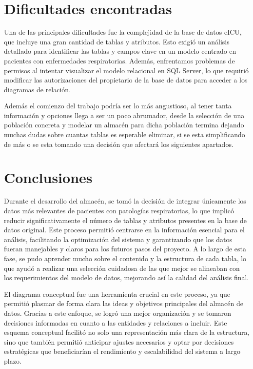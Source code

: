 \documentclass[12pt, a4paper, twoside]{article}
\begin{document}
	

	
	
	
	
	\section{Dificultades encontradas}
	
	
	Una de las principales dificultades fue la complejidad de la base de datos eICU, que incluye una gran cantidad de tablas y atributos. Esto exigió un análisis detallado para identificar las tablas y campos clave en un modelo centrado en pacientes con enfermedades respiratorias. Además, enfrentamos problemas de permisos al intentar visualizar el modelo relacional en SQL Server, lo que requirió modificar las autorizaciones del propietario de la base de datos para acceder a los diagramas de relación.
	
	Además el comienzo del trabajo podría ser lo más angustioso, al tener tanta información y opciones llega a ser un poco abrumador, desde la selección de una población concreta y modelar un almacén para dicha población termina dejando muchas dudas sobre cuantas tablas es esperable eliminar, si se esta simplificando de más o se esta tomando una decisión que afectará los siguientes apartados. 
	
	\section{Conclusiones}
	
	Durante el desarrollo del almacén, se tomó la decisión de integrar únicamente los datos más relevantes de pacientes con patologías respiratorias, lo que implicó reducir significativamente el número de tablas y atributos presentes en la base de datos original. Este proceso permitió centrarse en la información esencial para el análisis, facilitando la optimización del sistema y garantizando que los datos fueran manejables y claros para los futuros pasos del proyecto. A lo largo de esta fase, se pudo aprender mucho sobre el contenido y la estructura de cada tabla, lo que ayudó a realizar una selección cuidadosa de las que mejor se alineaban con los requerimientos del modelo de datos, mejorando así la calidad del análisis final.
	
	El diagrama conceptual fue una herramienta crucial en este proceso, ya que permitió plasmar de forma clara las ideas y objetivos principales del almacén de datos. Gracias a este enfoque, se logró una mejor organización y se tomaron decisiones informadas en cuanto a las entidades y relaciones a incluir. Este esquema conceptual facilitó no solo una representación más clara de la estructura, sino que también permitió anticipar ajustes necesarios y optar por decisiones estratégicas que beneficiarían el rendimiento y escalabilidad del sistema a largo plazo.
	
\end{document}
